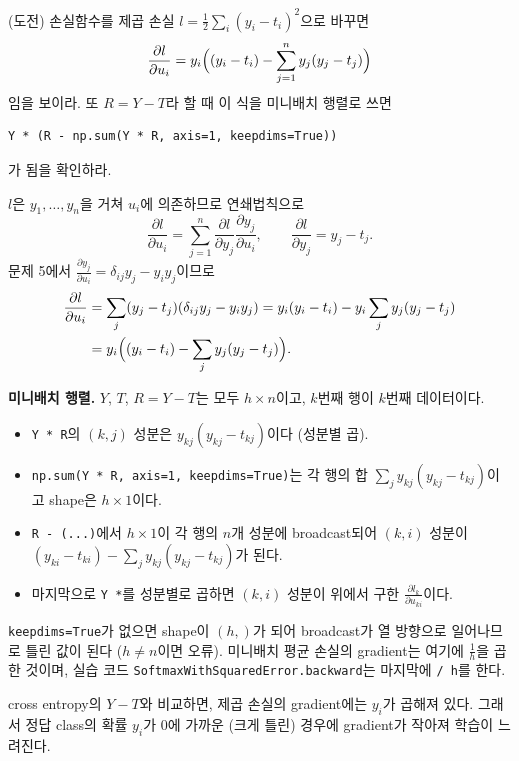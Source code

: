 \documentclass[11pt,a4paper]{article}
\newcommand{\pd}[2]{\frac{\partial #1}{\partial #2}}
\begin{document}
\begin{problems}
\item (도전) 손실함수를 제곱 손실 $l=\frac12\sum_i(y_i-t_i)^2$으로 바꾸면
\[
\pd{l}{u_i}=y_i\Bigl((y_i-t_i)-\sum_{j=1}^{n}y_j(y_j-t_j)\Bigr)
\]
임을 보이라. 또 $R=Y-T$라 할 때 이 식을 미니배치 행렬로 쓰면
\begin{lstlisting}[numbers=none]
Y * (R - np.sum(Y * R, axis=1, keepdims=True))
\end{lstlisting}
가 됨을 확인하라.

\begin{sol}
$l$은 $y_1,\ldots,y_n$을 거쳐 $u_i$에 의존하므로 연쇄법칙으로
\[
\pd{l}{u_i}=\sum_{j=1}^{n}\pd{l}{y_j}\pd{y_j}{u_i},\qquad
\pd{l}{y_j}=y_j-t_j .
\]
문제 5에서 $\pd{y_j}{u_i}=\delta_{ij}y_j-y_iy_j$이므로
\begin{align*}
\pd{l}{u_i}&=\sum_{j}(y_j-t_j)(\delta_{ij}y_j-y_iy_j)
=y_i(y_i-t_i)-y_i\sum_{j}y_j(y_j-t_j)\\
&=y_i\Bigl((y_i-t_i)-\sum_{j}y_j(y_j-t_j)\Bigr).
\end{align*}

\textbf{미니배치 행렬.} $Y$, $T$, $R=Y-T$는 모두 $h\times n$이고, $k$번째 행이 $k$번째 데이터이다.
\begin{itemize}[leftmargin=1.5em,itemsep=2pt]
\item \texttt{Y * R}의 $(k,j)$ 성분은 $y_{kj}(y_{kj}-t_{kj})$이다 (성분별 곱).
\item \texttt{np.sum(Y * R, axis=1, keepdims=True)}는 각 행의 합 $\sum_jy_{kj}(y_{kj}-t_{kj})$이고 shape은 $h\times1$이다.
\item \texttt{R - (...)}에서 $h\times1$이 각 행의 $n$개 성분에 broadcast되어 $(k,i)$ 성분이 $(y_{ki}-t_{ki})-\sum_jy_{kj}(y_{kj}-t_{kj})$가 된다.
\item 마지막으로 \texttt{Y *}를 성분별로 곱하면 $(k,i)$ 성분이 위에서 구한 $\pd{l_k}{u_{ki}}$이다.
\end{itemize}
\texttt{keepdims=True}가 없으면 shape이 $(h,)$가 되어 broadcast가 열 방향으로 일어나므로 틀린 값이 된다 ($h\ne n$이면 오류).
미니배치 평균 손실의 gradient는 여기에 $\frac1h$을 곱한 것이며, 실습 코드 \texttt{SoftmaxWithSquaredError.backward}는 마지막에 \texttt{/ h}를 한다.

cross entropy의 $Y-T$와 비교하면, 제곱 손실의 gradient에는 $y_i$가 곱해져 있다.
그래서 정답 class의 확률 $y_i$가 $0$에 가까운 (크게 틀린) 경우에 gradient가 작아져 학습이 느려진다.
\end{sol}

\end{problems}
\end{document}
